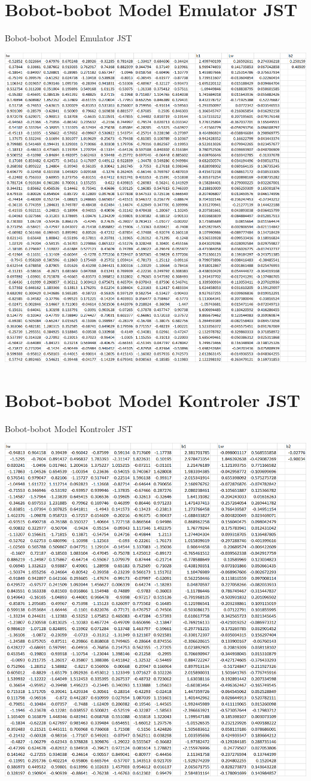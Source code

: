 \section{Bobot-bobot Model Emulator JST}
\begin{table}[!h]
	\caption{Bobot-bobot Model Emulator JST}
	\label{tbl:A:BobotEmulator}
	\centering
	\includegraphics[width=1\textwidth]{figures/BobotEmulator}
\end{table}
\vspace{6em}
\hfill\break

\section{Bobot-bobot Model Kontroler JST}
\begin{table}[!h]
	\caption{Bobot-bobot Model Kontroler JST}
	\label{tbl:A:BobotKontroler}
	\centering
	\includegraphics[width=1\textwidth]{figures/BobotKontroler}
\end{table}